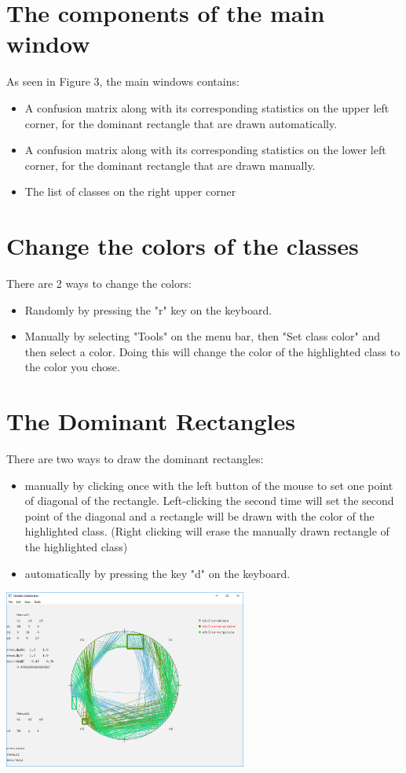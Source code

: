\documentclass[12pt]{article}
\begin{document}
	\section{The components of the main window}
		As seen in Figure 3, the main windows contains:
		\begin{itemize}
			\item A confusion matrix along with its corresponding statistics on the upper left corner, for the dominant rectangle that are drawn automatically.
			\item A confusion matrix along with its corresponding statistics on the lower left corner, for the dominant rectangle that are drawn manually.
			\item The list of classes on the right upper corner
		\end{itemize}
		
		
		
	\section {Change the colors of the classes}
		There are 2 ways to change the colors: 
		\begin{itemize}
			\item Randomly by pressing the "r" key on the keyboard.
			\item Manually by selecting "Tools" on the menu bar, then "Set class color" and then select a color. Doing this will change the color of the highlighted class to the color you chose.
		\end{itemize}
	
	\section{The Dominant Rectangles}
		There are two ways to draw the dominant rectangles:
		\begin{itemize}
			\item manually by clicking once with the left button of the mouse to set one point of diagonal of the rectangle. Left-clicking the second time will set the second point of the diagonal and a rectangle will be drawn with the color of the highlighted class. (Right clicking will erase the manually drawn rectangle of the highlighted class) 
			\item automatically by pressing the key "d" on the keyboard.
		\end{itemize}	
		
		\includegraphics[width=8cm]{dominant_rectangles.png}\\	
	
\end{document}
